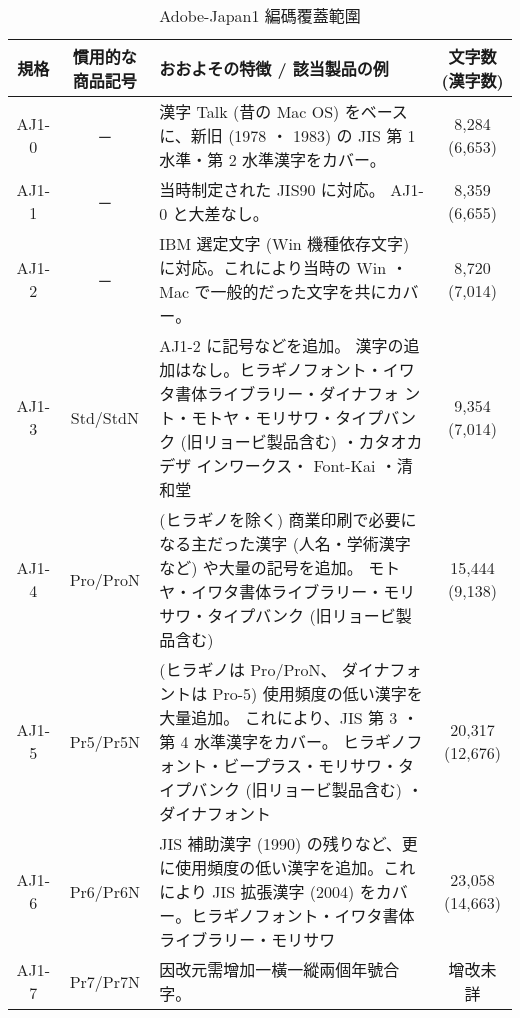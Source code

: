 \documentclass[a4,11pt,uplatex,openleft]{jsarticle}
\begin{document}
\begin{appendix}
\begin{table}[h]
\caption{\fontsize{12pt}{15pt}\selectfont Adobe-Japan1 編碼覆蓋範圍} %
\centering %
\begin{tabular}{|c|c|p{7cm}|c|}%
\hline  %

規格 & 慣用的な商品記号	& おおよその特徴 / 該当製品の例	 & 文字数(漢字数) \\

\hline  %
AJ1-0 &	─	 & 漢字 Talk (昔の Mac OS)
をベースに、新旧 (1978 ・ 1983) の JIS 第 1 水準・第 2 水準漢字をカバー。
& 8,284 (6,653) \\
\hline
AJ1-1	& ─ &	当時制定された JIS90 に対応。
AJ1-0 と大差なし。 & 	8,359 (6,655) \\
\hline
AJ1-2	& ─	 &  IBM 選定文字 (Win 機種依存文字)
に対応。これにより当時の Win ・ Mac で一般的だった文字を共にカバー。
& 	8,720 (7,014) \\
\hline

AJ1-3	& Std/StdN	&   AJ1-2 に記号などを追加。
漢字の追加はなし。ヒラギノフォント・イワタ書体ライブラリー・ダイナフォ
ント・モトヤ・モリサワ・タイプバンク (旧リョービ製品含む) ・カタオカデザ
インワークス・ Font-Kai ・清和堂 & 9,354 (7,014) \\

\hline
AJ1-4	& Pro/ProN &
(ヒラギノを除く)	商業印刷で必要になる主だった漢字
(人名・学術漢字など) や大量の記号を追加。
モトヤ・イワタ書体ライブラリー・モリサワ・タイプバンク
(旧リョービ製品含む)  & 15,444 (9,138) \\
\hline
AJ1-5	& Pr5/Pr5N &
(ヒラギノは Pro/ProN、
ダイナフォントは Pro-5)	使用頻度の低い漢字を大量追加。
これにより、JIS 第 3 ・第 4 水準漢字をカバー。
ヒラギノフォント・ビープラス・モリサワ・タイプバンク
(旧リョービ製品含む) ・ダイナフォント  & 20,317 (12,676) \\

\hline
AJ1-6	& Pr6/Pr6N	&  JIS 補助漢字 (1990)
の残りなど、更に使用頻度の低い漢字を追加。これにより JIS 拡張漢字
(2004) をカバー。ヒラギノフォント・イワタ書体ライブラリー・モリサワ
& 23,058 (14,663) \\

\hline
AJ1-7	& Pr7/Pr7N	&  因改元需增加一橫一縱兩個年號合字。 & 增改未詳 \\

\hline %
\end{tabular}

\end{table}


\end{appendix}
\end{document}
